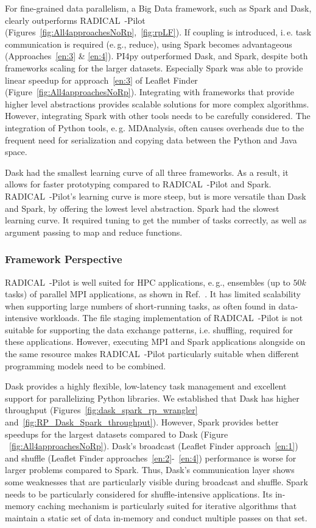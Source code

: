 For fine-grained data parallelism, a Big Data framework, such as Spark and Dask, clearly outperforms RADICAL~-Pilot (Figures~\ref{fig:All4approachesNoRp},~\ref{fig:rpLF}).
If coupling is introduced, i.\,e. task communication is required (e.\,g., reduce), using Spark becomes advantageous (Approaches~\ref{en:3} \& \ref{en:4}). 
PI4py outperformed Dask, and Spark, despite both frameworks scaling for the larger datasets.
Especially Spark was able to provide linear speedup for approach~\ref{en:3} of Leaflet Finder (Figure~\ref{fig:All4approachesNoRp}).
Integrating with frameworks that provide higher level abstractions provides scalable solutions for more complex algorithms.
However, integrating Spark with other tools needs to be carefully considered.
The integration of Python tools, e.\,g. MDAnalysis, often causes overheads due to the frequent need for serialization and copying data between the Python and Java space.

Dask had the smallest learning curve of all three frameworks.
As a result, it allows for faster prototyping compared to RADICAL~-Pilot and Spark.
RADICAL~-Pilot's learning curve is more steep, but is more versatile than Dask and Spark, by offering the lowest level abstraction. 
Spark had the slowest learning curve.
It required tuning to get the number of tasks correctly, as well as argument passing to map and reduce functions.

\subsubsection{Framework Perspective}
RADICAL~-Pilot is well suited for HPC applications, e.\,g., ensembles (up to $50k$ tasks) of parallel MPI applications, as shown in Ref.~\cite{merzky2018design,merzky2019using}.
It has limited scalability when supporting large numbers of short-running tasks, as often found in data-intensive workloads.
The file staging implementation of RADICAL~-Pilot is not suitable for supporting the data exchange patterns, i.e. shuffling, required for these applications.
However, executing MPI and Spark applications alongside on the same resource makes RADICAL~-Pilot particularly suitable when different programming models need to be combined.

Dask provides a highly flexible, low-latency task management and excellent support for parallelizing Python libraries.
We established that Dask has higher throughput (Figures~\ref{fig:dask_spark_rp_wrangler} and~\ref{fig:RP_Dask_Spark_throughput}).
However, Spark provides better speedups for the largest datasets compared to Dask (Figure ~\ref{fig:All4approachesNoRp}).
Dask's broadcast (Leaflet Finder approach~\ref{en:1}) and shuffle (Leaflet Finder approaches~\ref{en:2}-~\ref{en:4}) performance is worse for larger problems compared to Spark.
Thus, Dask's communication layer shows some weaknesses that are particularly visible during broadcast and shuffle.
Spark needs to be particularly considered for shuffle-intensive applications.
Its in-memory caching mechanism is particularly suited for iterative algorithms that maintain a static set of data in-memory and conduct multiple passes on that set.
